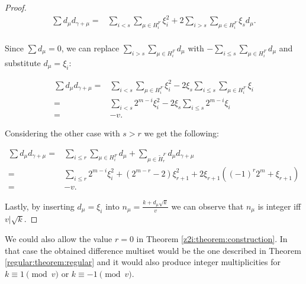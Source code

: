 \begin{proof}
    \begin{equation}
        \begin{split}
            \sum d_\mu d_{\gamma+\mu}
              = & \sum\limits_{i<s} \sum\limits_{\mu \in H_i^F} \xi_i^2
                + 2\sum\limits_{i>s} \sum\limits_{\mu \in H_i^F} \xi_s d_\mu. \\
        \end{split}
    \end{equation}
    
    Since $\sum d_{\mu} = 0$, we can replace $\sum_{i>s} \sum_{\mu \in H_i^F} d_\mu$ with $-\sum_{i\leq s} \sum_{\mu \in H_i^F} d_\mu$ and substitute $d_\mu=\xi_i$:
    
    \begin{equation}
        \begin{split}
            \sum d_\mu d_{\gamma+\mu}
              = & \sum\limits_{i<s} \sum\limits_{\mu \in H_i^F} \xi_i^2
                - 2 \xi_s \sum\limits_{i \leq s} \sum\limits_{\mu \in H_i^F} \xi_i \\
              = & \sum\limits_{i<s} 2^{m-i} \xi_i^2
                - 2 \xi_s \sum\limits_{i \leq s}  2^{m-i} \xi_i \\
              = & - v.
        \end{split}
    \end{equation}
    
    Considering the other case with $s > r$ we get the following:
    
    \begin{equation}
        \begin{split}
            \sum d_\mu d_{\gamma+\mu}
              = & \sum\limits_{i \leq r} \sum\limits_{\mu \in H_i^F} d_\mu
                + \sum\limits_{\mu \in \widetilde H_r^F} d_\mu d_{\gamma + \mu} \\
              = & \sum\limits_{i\leq r} 2^{m-i} \xi_i^2
                + (2^{m-r}-2) \xi_{r+1}^2 + 2\xi_{r+1}((-1)^r 2^m + \xi_{r+1}) \\
              = & -v.
        \end{split}
    \end{equation}
    
    Lastly, by inserting $d_\mu = \xi_i$ into $n_\mu=\frac{k+d_\mu \sqrt k}v$ we can observe that $n_\mu$ is integer iff $v | \sqrt k$.
\end{proof}

\begin{remark}
    We could also allow the value $r=0$ in Theorem \ref{z2i:theorem:construction}. In that case the obtained difference multiset would be the one described in 
Theorem \ref{regular:theorem:regular} and it would also produce  integer multiplicities for $k \equiv 1 \pmod v$ or $k \equiv -1 \pmod v$.
\end{remark}

